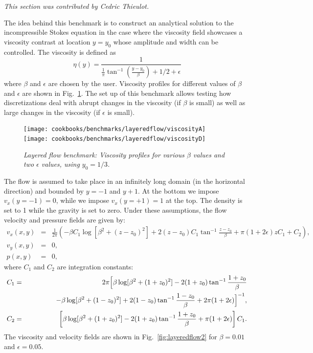 \documentclass{article}
\begin{document}
\textit{This section was contributed by Cedric Thieulot.}

The idea behind this benchmark is to construct an analytical solution to the incompressible
Stokes equation in the case where the viscosity field showcases a 
viscosity contrast at location $y=y_0$ whose amplitude and width can be controlled. 
The viscosity is defined as
\[
\eta(y)=\frac{1}{\frac{1}{\pi} \tan^{-1} (\frac{y-y_0}{\beta} ) + 1/2 + \epsilon}
\]
where $\beta$ and $\epsilon$ are chosen by the user. 
Viscosity profiles for different values of $\beta$ and $\epsilon$ are
shown in Fig.~\ref{fig:layeredflow1}. The set up of this benchmark
allows testing how discretizations deal with abrupt changes in the
viscosity (if $\beta$ is small) as well as large changes in the
viscosity (if $\epsilon$ is small).

\begin{figure}
\begin{center}
  \centering
  \texttt{[image: cookbooks/benchmarks/layeredflow/viscosityA]}
  \texttt{[image: cookbooks/benchmarks/layeredflow/viscosityD]}
  \caption{\it Layered flow benchmark: Viscosity profiles for various
    $\beta$ values and two $\epsilon$ values, using $y_0=1/3$.} 
  \label{fig:layeredflow1}
\end{center}
\end{figure}

The flow is assumed to take place in an infinitely long domain (in the horizontal direction)
and bounded by $y=-1$ and $y+1$.
At the bottom we impose $v_x(y=-1)=0$, while we impose $v_x(y=+1)=1$ at the top.
The density is set to 1 while the gravity is set to zero.
Under these assumptions, the flow velocity and pressure fields are given by:
\begin{eqnarray}
v_x(x,y)&=&\frac{1}{2\pi} \left(  -\beta C_1 \log [\beta^2 + (z-z_0)^2]  + 2 (z-z_0)  C_1 \tan^{-1} \frac{z-z_0}{\beta} + \pi (1+2\epsilon) z C_1  + C_2 \right), \nonumber\\
v_y(x,y) &=& 0, \nonumber\\ 
p(x,y) &=& 0,
\end{eqnarray}
where $C_1$ and $C_2$ are integration constants:
\begin{eqnarray*}
C_1 &=& 2\pi \Bigl[ 
 \beta  \log [\beta^2 + (1+z_0)^2]  -  2(1+z_0) \tan^{-1}
 \frac{1+z_0}{\beta}
 \\
 &&\qquad\qquad
-\beta  \log [\beta^2 + (1-z_0)^2]  +  2(1-z_0) \tan^{-1} \frac{1-z_0}{\beta} + 2\pi (1+2\epsilon)   \Bigr]^{-1},\\
C_2 &=& \left[ \beta  \log [\beta^2 + (1+z_0)^2]  -  2(1+z_0) \tan^{-1} \frac{1+z_0}{\beta} + \pi(1+2\epsilon) \right]C_1.
\end{eqnarray*}
The viscosity and velocity fields are shown in Fig.~\ref{fig:layeredflow2} for $\beta=0.01$ and $\epsilon=0.05$. 
\end{document}
